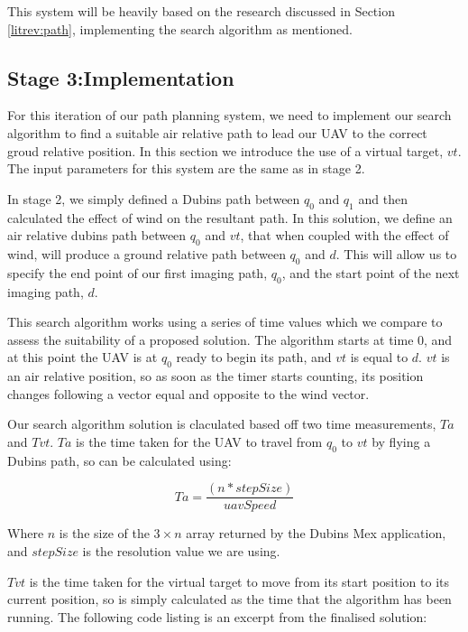 This system will be heavily based on the research discussed in Section \ref{litrev:path}, implementing the search algorithm as mentioned.

\subsection{Stage 3:Implementation}
\label{task1:stage3:implementation}

For this iteration of our path planning system, we need to implement our search algorithm to find a suitable air relative path to lead our UAV to the correct groud relative position. In this section we introduce the use of a virtual target, $vt$. The input parameters for this system are the same as in stage 2. 

In stage 2, we simply defined a Dubins path between $q_0$ and $q_1$ and then calculated the effect of wind on the resultant path. In this solution, we define an air relative dubins path between $q_0$ and $vt$, that when coupled with the effect of wind, will produce a ground relative path between $q_0$ and $d$. This will allow us to specify the end point of our first imaging path, $q_0$, and the start point of the next imaging path, $d$. 

This search algorithm works using a series of time values which we compare to assess the suitability of a proposed solution. The algorithm starts at time 0, and at this point the UAV is at $q_0$ ready to begin its path, and $vt$ is equal to $d$. $vt$ is an air relative position, so as soon as the timer starts counting, its position changes following a vector equal and opposite to the wind vector. 

Our search algorithm solution is claculated based off two time measurements, $Ta$ and $Tvt$. $Ta$ is the time taken for the UAV to travel from $q_0$ to $vt$ by flying a Dubins path, so can be calculated using:

\begin{equation}
	Ta = \frac{(n*stepSize)}{uavSpeed}
\end{equation}

Where $n$ is the size of the  $3 \times n$ array returned by the Dubins Mex application, and $stepSize$ is the resolution value we are using.

$Tvt$ is the time taken for the virtual target to move from its start position to its current position, so is simply calculated as the time that the algorithm has been running. The following code listing is an excerpt from the finalised solution:

